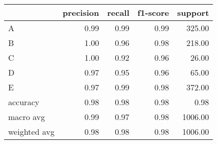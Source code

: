 \begin{tabular}{|l|r|r|r|r|}
\hline
{} &  precision &  recall &  f1-score &  support \\
\hline
A            &       0.99 &    0.99 &      0.99 &   325.00 \\
B            &       1.00 &    0.96 &      0.98 &   218.00 \\
C            &       1.00 &    0.92 &      0.96 &    26.00 \\
D            &       0.97 &    0.95 &      0.96 &    65.00 \\
E            &       0.97 &    0.99 &      0.98 &   372.00 \\
accuracy     &       0.98 &    0.98 &      0.98 &     0.98 \\
macro avg    &       0.99 &    0.97 &      0.98 &  1006.00 \\
weighted avg &       0.98 &    0.98 &      0.98 &  1006.00 \\
\hline
\end{tabular}
